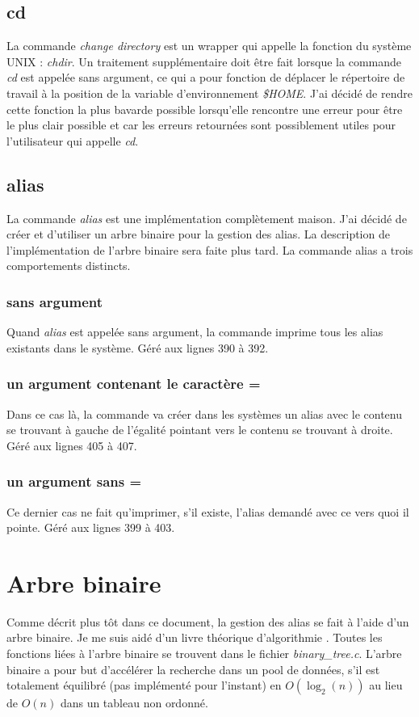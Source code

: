 \documentclass[a4paper,10pt]{article}
\begin{document}
\subsection{cd}
La commande \emph{change directory} est un wrapper qui appelle la fonction du système UNIX : \emph{chdir}.
Un traitement supplémentaire doit être fait lorsque la commande \emph{cd} est appelée sans argument, ce qui a pour fonction de déplacer le répertoire de travail à la position de la variable d'environnement \emph{\$HOME}.
J'ai décidé de rendre cette fonction la plus bavarde possible lorsqu'elle rencontre une erreur pour être le plus clair possible et car les erreurs retournées sont possiblement utiles pour l'utilisateur qui appelle \emph{cd}.
\subsection{alias}
La commande \emph{alias} est une implémentation complètement maison. J'ai décidé de créer et d'utiliser un arbre binaire pour la gestion des alias. La description de l'implémentation de l'arbre binaire sera faite plus tard.
La commande alias a trois comportements distincts.
\subsubsection{sans argument}
Quand \emph{alias} est appelée sans argument, la commande imprime tous les alias existants dans le système. Géré aux lignes 390 à 392.
\subsubsection{un argument contenant le caractère =}
Dans ce cas là, la commande va créer dans les systèmes un alias avec le contenu se trouvant à gauche de l'égalité pointant vers le contenu se trouvant à droite. Géré aux lignes 405 à 407.
\subsubsection{un argument sans =}
Ce dernier cas ne fait qu'imprimer, s'il existe, l'alias demandé avec ce vers quoi il pointe. Géré aux lignes 399 à 403.
\section{Arbre binaire}
Comme décrit plus tôt dans ce document, la gestion des alias se fait à l'aide d'un arbre binaire.
Je me suis aidé d'un livre théorique d'algorithmie \cite{ref}. Toutes les fonctions liées à l'arbre binaire se trouvent dans le fichier \emph{binary\_tree.c}. L'arbre binaire a pour but d'accélérer la recherche dans un pool de données, s'il est totalement équilibré (pas implémenté pour l'instant) en $O(\log_2(n))$ au lieu de $O(n)$ dans un tableau non ordonné.
\end{document}
